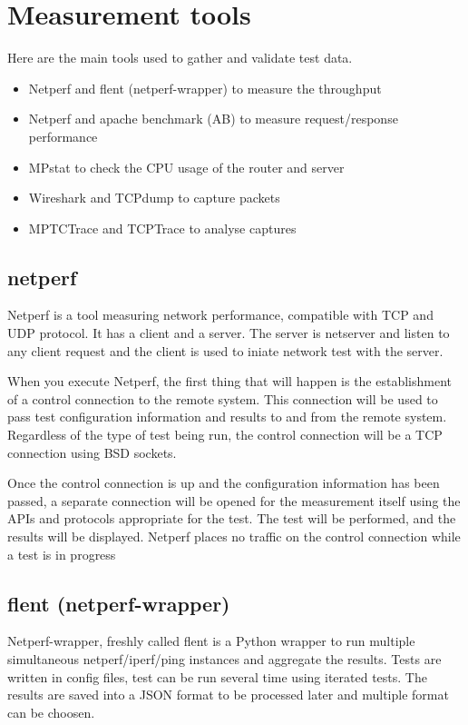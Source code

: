  \section{Measurement tools}

  Here are the main tools used to gather and validate test data.

  \begin{itemize}
    \item Netperf and flent (netperf-wrapper) to measure the throughput
    \item Netperf and apache benchmark (AB) to measure request/response performance
    \item MPstat to check the CPU usage of the router and server
    \item Wireshark and TCPdump to capture packets
    \item MPTCTrace and TCPTrace to analyse captures
  \end{itemize}

  \subsection{netperf \autocite{netperf}}
  Netperf is a tool measuring network performance, compatible with TCP and UDP protocol. It has a client
  and a server. The server is netserver and listen to any client request and the client is used to iniate network test with the server.

  When you execute Netperf, the first thing that will happen is the establishment of a control connection to the remote system. This connection will be used to pass test configuration information and results to and from the remote system. Regardless of the type of test being run, the control connection will be a TCP connection using BSD sockets.

  Once the control connection is up and the configuration information has been passed, a separate connection will be opened for the measurement itself using the APIs and protocols appropriate for the test. The test will be performed, and the results will be displayed.
  Netperf places no traffic on the control connection while a test is in progress

  \subsection{flent (netperf-wrapper) \autocite{flent}}

  Netperf-wrapper, freshly called flent is a Python wrapper to run multiple simultaneous netperf/iperf/ping instances and aggregate the results. Tests are written in config files,
  test can be run several time using iterated tests. The results are saved into a JSON format to be processed later and multiple format can be choosen.

